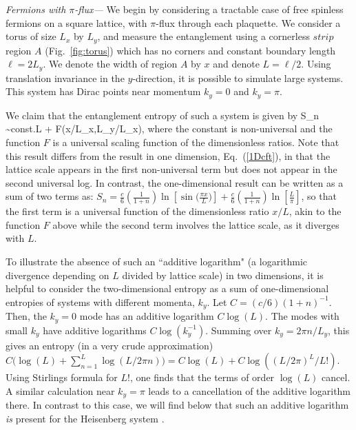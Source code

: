\documentclass[prl,aps,twocolumn,floatfix,amsmath,amssymb,superscriptaddress,tightenlines]{revtex4}
\begin{document}
{\it Fermions with $\pi$-flux---}
We begin by considering a tractable case of
free spinless fermions on a square lattice, with $\pi$-flux through each plaquette.  We consider a torus of size $L_x$ by $L_y$, and
measure the entanglement %
using a cornerless $strip$ region $A$ (Fig.~\ref{fig:torus}) which has no corners and constant boundary length $\ell = 2L_y$.
We denote the width of region $A$ by $x$ and denote $L = \ell/2$.
Using translation invariance in the $y$-direction, it is possible to simulate large systems.  This system has Dirac points near momentum $k_y=0$ and $k_y=\pi$.

We claim that the entanglement entropy of such a system is given by
\be
S_n \sim {\rm const.}\times L + F(x/L_x,L_y/L_x),
\ee
where the constant is non-universal and the function $F$ is a universal scaling function of the dimensionless ratios.  Note that this result differs
from the result in one dimension, Eq.~(\ref{1Dcft}), in that the lattice scale appears in the first non-universal term but does not appear in the second universal log.  In contrast, the one-dimensional result can be written as a sum of two terms as:
$S_n = \frac{c}{6}\left({ \frac{1}{1+n} }\right) \ln[\sin\big( \frac{\pi x}{L} \big)]+\frac{c}{6}\left(\frac{1}{1+n}\right)\ln[\frac{L}{\pi}]$, so that the first term is a universal function of the dimensionless ratio $x/L$, akin to the function $F$ above while the second term involves the lattice scale, as it diverges with $L$.

To illustrate the absence of such an ``additive logarithm" (a logarithmic divergence depending on $L$ divided by lattice scale) in two dimensions, it is helpful to 
consider the two-dimensional entropy as a sum of one-dimensional entropies of systems with different momenta, $k_y$.  Let $C=(c/6)(1+n)^{-1}$.  Then, the $k_y=0$ mode has an additive logarithm $C \log(L)$.  The modes with small $k_y$ have additive logarithms $C \log(k_y^{-1})$.  Summing over $k_y=2\pi n/L_y$, this gives an entropy (in a very crude approximation) $C \big( \log(L)+\sum_{n=1}^{L} \log(L/2 \pi n) \big)=C\log(L) + C\log((L/2\pi)^L/L!)$.  Using Stirlings formula for $L!$, one finds that the terms of order $\log(L)$ cancel.  A similar calculation near $k_y=\pi$ leads to a cancellation of the additive logarithm there.
In contrast to this case, we will find below that such an additive logarithm {\it is} present for the Heisenberg system \cite{HeisLog}.
\end{document}
